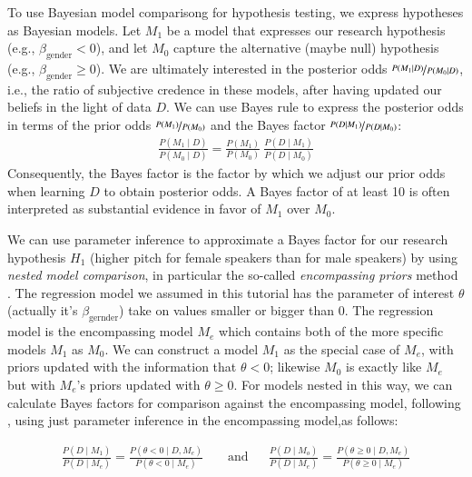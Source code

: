 \documentclass[nobib]{tufte-handout}
\begin{document}
To use Bayesian model comparisong for hypothesis testing, we express hypotheses as Bayesian
models.
%
Let $M_1$ be a model that expresses our research hypothesis (e.g., $\beta_{\text{gender}} <
0$), and let $M_0$ capture the alternative (maybe null) hypothesis (e.g.,
$\beta_{\text{gender}} \geq 0$).
%
%
We are ultimately interested in the posterior odds $\nicefrac{P(M_1
  \mid D)}{P(M_0 \mid D)}$, i.e., the ratio of subjective credence in these models, after
having updated our beliefs in the light of data $D$.
%
We can use Bayes rule to express the posterior odds in terms of the prior odds
$\nicefrac{P(M_1)}{P(M_0)}$ and the Bayes factor $\nicefrac{P(D \mid M_1)}{P(D \mid M_0)}$:
%
\begin{align*}
  \frac{P(M_1 \mid D)}{P(M_0 \mid D)} = \frac{P(M_1)}{P(M_0)} \ \frac{P(D \mid M_1)}{P(D \mid M_0)}
\end{align*}
%
Consequently, the Bayes factor is the factor by which we adjust our prior odds when
learning $D$ to obtain posterior odds. A Bayes factor of at least 10 is often interpreted as
substantial evidence in favor of $M_1$ over $M_0$.

We can use parameter inference to approximate a Bayes factor for our research hypothesis $H_1$
(higher pitch for female speakers than for male speakers) by using \emph{nested model
  comparison}, in particular the so-called \emph{encompassing priors} method
\citep{KlugkistKato2005:Bayesian-model-}. The regression model we assumed in this tutorial has
the parameter of interest $\theta$ (actually it's $\beta_{\text{gernder}}$) take on values
smaller or bigger than 0. The regression model is the encompassing model $M_e$ which contains
both of the more specific models $M_1$ as $M_0$. We can construct a model $M_1$ as the special
case of $M_e$, with priors updated with the information that $\theta < 0$; likewise $M_0$ is
exactly like $M_e$ but with $M_e$'s priors updated with $\theta \geq 0$. For models nested in
this way, we can calculate Bayes factors for comparison against the encompassing model,
following \citet{KlugkistKato2005:Bayesian-model-}, using just parameter inference in the
encompassing model,as follows:

\begin{align*}
  \frac{P(D \mid M_1)}{P(D \mid M_e)} = \frac{P(\theta < 0 \mid D, M_e)}{P(\theta < 0 \mid M_e)} && \text{ and} &&
  \frac{P(D \mid M_o)}{P(D \mid M_e)} = \frac{P(\theta \geq 0 \mid D, M_e)}{P(\theta \geq 0 \mid M_e)} 
\end{align*}
\end{document}
